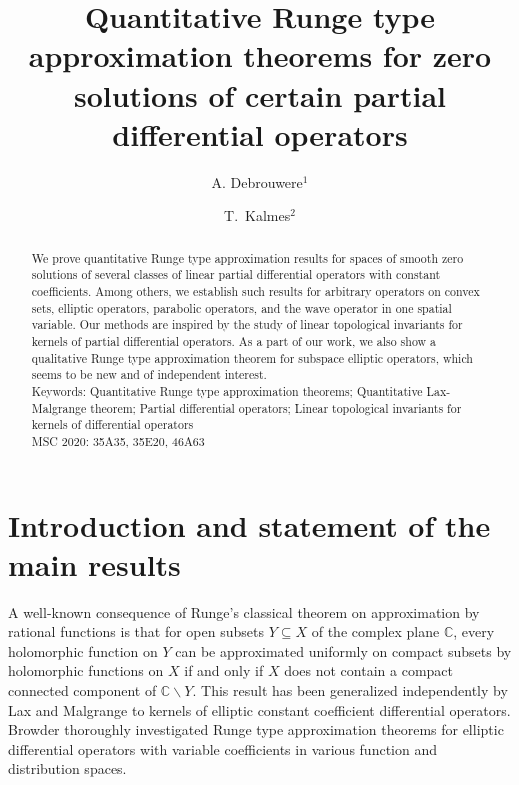 \documentclass[12pt]{amsart}
\theoremstyle{definition}
\theoremstyle{remark}
\numberwithin{equation}{section}
\begin{document}
	
\title[Quantitative Runge type approximation theorems]{Quantitative Runge type approximation theorems for zero solutions of certain partial differential operators}
	
\author[A. Debrouwere]{A. Debrouwere$^1$}
\address{$^1$Department of Mathematics and Data Science, Vrije Universiteit Brussel, Pleinlaan 2, 1050 Brussels, Belgium}

\author[T.\ Kalmes]{T.\ Kalmes$^2$}
\address{$^2$Faculty of Mathematics, Chemnitz University of Technology, 09107 Chemnitz, Germany}


\begin{abstract}
	We prove  quantitative Runge type approximation results for spaces of smooth zero solutions of several classes of linear partial differential operators with constant coefficients. Among others, we establish such  results for arbitrary operators on convex sets, elliptic operators, parabolic operators, and the wave operator in one spatial variable. Our methods are inspired by the study of linear topological invariants for kernels of partial differential operators.  As a part of our work, we also show a  qualitative Runge type approximation theorem for subspace elliptic operators, which seems to be new and of independent interest. \\
	
	\noindent Keywords: Quantitative Runge type approximation theorems; Quantitative Lax-Malgrange theorem; Partial differential operators; Linear topological invariants for kernels of differential operators\\
	
	\noindent MSC 2020: 35A35, 35E20, 46A63
	
\end{abstract}

\maketitle

\section{Introduction and statement of the main results}

A well-known consequence of Runge's classical theorem on  approximation by rational functions is that for open subsets $Y\subseteq X$ of the complex plane $\mathbb{C}$, every holomorphic function on $Y$ can be approximated uniformly on compact subsets by holomorphic functions on $X$ if and only if  $X$ does not contain a compact connected component of $\mathbb{C}\backslash Y$. This result has been generalized independently by Lax \cite{Lax} and Malgrange \cite{Malgrange} to kernels of elliptic constant coefficient differential operators. Browder \cite{Browder1962b, Browder1962}  thoroughly investigated Runge type approximation theorems for elliptic differential operators with variable coefficients in various function and distribution spaces. 
\end{document}
